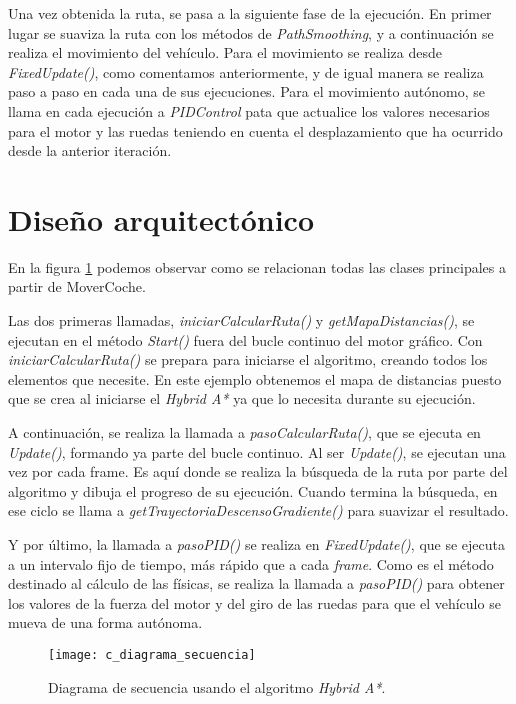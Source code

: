 Una vez obtenida la ruta, se pasa a la siguiente fase de la ejecución. En primer lugar se suaviza la ruta con los métodos de \textit{PathSmoothing}, y a continuación se realiza el movimiento del vehículo. Para el movimiento se realiza desde \textit{FixedUpdate()}, como comentamos anteriormente, y de igual manera se realiza paso a paso en cada una de sus ejecuciones. Para el movimiento autónomo, se llama en cada ejecución a \textit{PIDControl} pata que actualice los valores necesarios para el motor y las ruedas teniendo en cuenta el desplazamiento que ha ocurrido desde la anterior iteración.

\section{Diseño arquitectónico}
En la figura \ref{fig:cdiagramasecuencia} podemos observar como se relacionan todas las clases principales a partir de MoverCoche.

Las dos primeras llamadas, \textit{iniciarCalcularRuta()} y \textit{getMapaDistancias()}, se ejecutan en el método \textit{Start()} fuera del bucle continuo del motor gráfico. Con \textit{iniciarCalcularRuta()} se prepara para iniciarse el algoritmo, creando todos los elementos que necesite. En este ejemplo obtenemos el mapa de distancias puesto que se crea al iniciarse el \textit{Hybrid A*} ya que lo necesita durante su ejecución.

A continuación, se  realiza la llamada a \textit{pasoCalcularRuta()}, que se ejecuta en \textit{Update()}, formando ya parte del bucle continuo. Al ser \textit{Update()}, se ejecutan una vez por cada frame. Es aquí donde se realiza la búsqueda de la ruta por parte del algoritmo y dibuja el progreso de su ejecución. Cuando termina la búsqueda, en ese ciclo se llama a \textit{getTrayectoriaDescensoGradiente()} para suavizar el resultado.

Y por último, la llamada a \textit{pasoPID()} se realiza en \textit{FixedUpdate()}, que se ejecuta a un intervalo fijo de tiempo, más rápido que a cada \textit{frame}. Como es el método destinado al cálculo de las físicas, se realiza la llamada a \textit{pasoPID()} para obtener los valores de la fuerza del motor y del giro de las ruedas para que el vehículo se mueva de una forma autónoma.

\begin{figure}[htpb]
    \centering
    \texttt{[image: c\_diagrama\_secuencia]}
    \caption[Diagrama de secuencia]{Diagrama de secuencia usando el algoritmo \textit{Hybrid A*}.}
    \label{fig:cdiagramasecuencia}
\end{figure}


